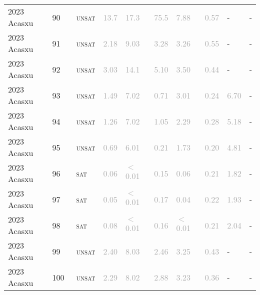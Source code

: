 \begin{center}
{\begin{longtable}{@{}llllllllll@{}}
2023 Acasxu & 90 & ~\textsc{unsat} & \textcolor{darkgray}{13.7} & \textcolor{darkgray}{17.3} & \textcolor{darkgray}{75.5} & \textcolor{darkgray}{7.88} & \textcolor{darkgray}{0.57} & - & - \\
2023 Acasxu & 91 & ~\textsc{unsat} & \textcolor{darkgray}{2.18} & \textcolor{darkgray}{9.03} & \textcolor{darkgray}{3.28} & \textcolor{darkgray}{3.26} & \textcolor{darkgray}{0.55} & - & - \\
2023 Acasxu & 92 & ~\textsc{unsat} & \textcolor{darkgray}{3.03} & \textcolor{darkgray}{14.1} & \textcolor{darkgray}{5.10} & \textcolor{darkgray}{3.50} & \textcolor{darkgray}{0.44} & - & - \\
2023 Acasxu & 93 & ~\textsc{unsat} & \textcolor{darkgray}{1.49} & \textcolor{darkgray}{7.02} & \textcolor{darkgray}{0.71} & \textcolor{darkgray}{3.01} & \textcolor{darkgray}{0.24} & \textcolor{darkgray}{6.70} & - \\
2023 Acasxu & 94 & ~\textsc{unsat} & \textcolor{darkgray}{1.26} & \textcolor{darkgray}{7.02} & \textcolor{darkgray}{1.05} & \textcolor{darkgray}{2.29} & \textcolor{darkgray}{0.28} & \textcolor{darkgray}{5.18} & - \\
2023 Acasxu & 95 & ~\textsc{unsat} & \textcolor{darkgray}{0.69} & \textcolor{darkgray}{6.01} & \textcolor{darkgray}{0.21} & \textcolor{darkgray}{1.73} & \textcolor{darkgray}{0.20} & \textcolor{darkgray}{4.81} & - \\
2023 Acasxu & 96 & ~\textsc{sat} & \textcolor{darkgray}{0.06} & \textcolor{darkgray}{$<$0.01} & \textcolor{darkgray}{0.15} & \textcolor{darkgray}{0.06} & \textcolor{darkgray}{0.21} & \textcolor{darkgray}{1.82} & - \\
2023 Acasxu & 97 & ~\textsc{sat} & \textcolor{darkgray}{0.05} & \textcolor{darkgray}{$<$0.01} & \textcolor{darkgray}{0.17} & \textcolor{darkgray}{0.04} & \textcolor{darkgray}{0.22} & \textcolor{darkgray}{1.93} & - \\
2023 Acasxu & 98 & ~\textsc{sat} & \textcolor{darkgray}{0.08} & \textcolor{darkgray}{$<$0.01} & \textcolor{darkgray}{0.16} & \textcolor{darkgray}{$<$0.01} & \textcolor{darkgray}{0.21} & \textcolor{darkgray}{2.04} & - \\
2023 Acasxu & 99 & ~\textsc{unsat} & \textcolor{darkgray}{2.40} & \textcolor{darkgray}{8.03} & \textcolor{darkgray}{2.46} & \textcolor{darkgray}{3.25} & \textcolor{darkgray}{0.43} & - & - \\
2023 Acasxu & 100 & ~\textsc{unsat} & \textcolor{darkgray}{2.29} & \textcolor{darkgray}{8.02} & \textcolor{darkgray}{2.88} & \textcolor{darkgray}{3.23} & \textcolor{darkgray}{0.36} & - & - \\

\end{longtable}}
\end{center}
